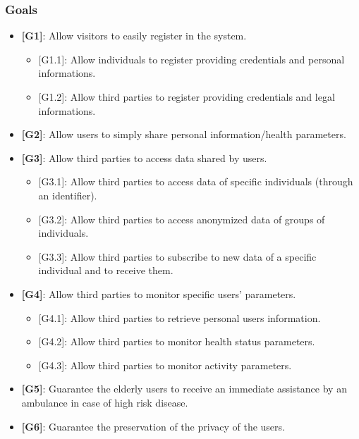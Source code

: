 \documentclass[12pt,a4paper]{article}
\begin{document}
		\subsubsection{Goals}
		\begin{itemize}
			\item {\textbf[}\textbf{G1}{\textbf]}: Allow visitors to easily register in the system.
				\begin{itemize}
					\item {[G1.1]}: Allow individuals to register providing credentials and personal informations.
					\item {[G1.2]}: Allow third parties to register providing credentials and legal informations.
				\end{itemize}
			\item {\textbf[}\textbf{G2}{\textbf]}: Allow users to simply share personal information/health parameters.
			\item {\textbf[}\textbf{G3}{\textbf]}: Allow third parties to access data shared by users.
				\begin{itemize}
					\item {[G3.1]}: Allow third parties to access data of specific individuals (through an identifier).
					\item {[G3.2]}: Allow third parties to access anonymized data of groups of individuals.
					\item {[G3.3]}: Allow third parties to subscribe to new data of a specific individual and to receive them.
				\end{itemize}
			\item {\textbf[}\textbf{G4}{\textbf]}: Allow third parties to monitor specific users' parameters.
				\begin{itemize}
					\item {[G4.1]}: Allow third parties to retrieve personal users information.
					\item {[G4.2]}: Allow third parties to monitor health status parameters.
					\item {[G4.3]}: Allow third parties to monitor activity parameters.
				\end{itemize}
			\item {\textbf[}\textbf{G5}{\textbf]}: Guarantee the elderly users to receive an immediate assistance by an ambulance in case of high risk disease.
			\item {\textbf[}\textbf{G6}{\textbf]}: Guarantee the preservation of the privacy of the users.
		\end{itemize}
	
\end{document}
